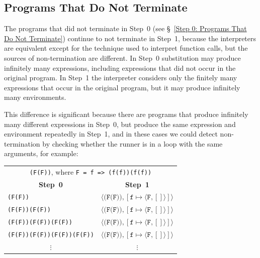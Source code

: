 \documentclass[12pt, oneside]{book}
\begin{document}
\subsection{Programs That Do Not Terminate}
\label{Step 1: Programs That Do Not Terminate}

The programs that did not terminate in Step~0 (see §~\ref{Step 0: Programs That Do Not Terminate}) continue to not terminate in Step~1, because the interpreters are equivalent except for the technique used to interpret function calls, but the sources of non-termination are different. In Step~0 substitution may produce infinitely many expressions, including expressions that did not occur in the original program. In Step~1 the interpreter considers only the finitely many expressions that occur in the original program, but it may produce infinitely many environments.

This difference is significant because there are programs that produce infinitely many different expressions in Step~0, but produce the same expression and environment repeatedly in Step~1, and in these cases we could detect non-termination by checking whether the runner is in a loop with the same arguments, for example:

\begin{center}
\begin{tabular}{ll}
\multicolumn{2}{c}{\texttt{(F(F))}, where \texttt{F = f => (f(f))(f(f))}} \\
\multicolumn{1}{c}{\textbf{Step~0}} & \multicolumn{1}{c}{\textbf{Step~1}} \\
\texttt{(F(F))} & $\langle \texttt{(F(F))}, [\texttt{f} \mapsto \langle \texttt{F}, [] \rangle] \rangle$ \\
\texttt{(F(F))(F(F))} & $\langle \texttt{(F(F))}, [\texttt{f} \mapsto \langle \texttt{F}, [] \rangle] \rangle$ \\
\texttt{(F(F))(F(F))(F(F))} & $\langle \texttt{(F(F))}, [\texttt{f} \mapsto \langle \texttt{F}, [] \rangle] \rangle$ \\
\texttt{(F(F))(F(F))(F(F))(F(F))} & $\langle \texttt{(F(F))}, [\texttt{f} \mapsto \langle \texttt{F}, [] \rangle] \rangle$ \\
\multicolumn{1}{c}{$\vdots$} & \multicolumn{1}{c}{$\vdots$} \\
\end{tabular}
\end{center}
\end{document}
